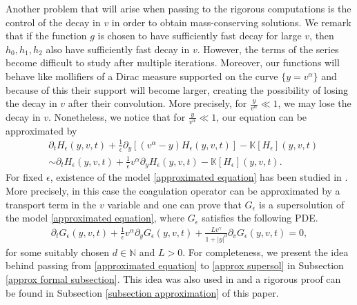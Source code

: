 \documentclass[11pt]{article}
\numberwithin{equation}{section}
\begin{document}
Another problem that will arise when passing to the rigorous computations is the control of the decay in $v$ in order to obtain mass-conserving solutions. We remark that if the function $g$ is chosen to have sufficiently fast decay for large $v$, then $h_{0}, h_{1}, h_{2}$ also have sufficiently fast decay in $v$. However, the terms of the series become difficult to study after multiple iterations. Moreover, our functions will behave like mollifiers of a Dirac measure supported on the curve $\{y=v^{\alpha}\}$ and because of this their support will become larger, creating the possibility of losing the decay in $v$ after their convolution. More precisely, for $\frac{y}{v^{\alpha}}\ll 1$, we may lose the decay in $v$. Nonetheless, we notice that for $\frac{y}{v^{\alpha}}\ll 1$, our equation can be approximated by
\begin{align}
&\partial_{t}H_{\epsilon}(y,v,t)+\frac{1}{\epsilon}\partial_{y}[(v^{\alpha}-y)H_{\epsilon}(y,v,t)]-\mathbb{K}[H_{\epsilon}](y,v,t)\label{approx eq part one}\\
&\sim \partial_{t}H_{\epsilon}(y,v,t)+\frac{1}{\epsilon}v^{\alpha}\partial_{y}H_{\epsilon}(y,v,t)-\mathbb{K}[H_{\epsilon}](y,v,t).\label{approximated equation}
\end{align}
For fixed $\epsilon$, existence of the model \eqref{approximated equation} has been studied in  \cite{cristianinhom}. More precisely, in this case the coagulation operator can be approximated by a transport term in the $v$ variable and one can prove that $G_{\epsilon}$ is a supersolution of the model \eqref{approximated equation}, where $G_{\epsilon}$ satisfies the following PDE.
\begin{align}\label{approx supersol}
    \partial_{t}G_{\epsilon}(y,v,t)+\frac{1}{\epsilon}v^{\alpha}\partial_{y}G_{\epsilon}(y,v,t)+\frac{L v^{\gamma} }{1+|y|^{d}}\partial_{v}G_{\epsilon}(y,v,t)=0,
\end{align}
for some suitably chosen $d\in\mathbb{N}$ and $L>0$. For completeness, we present the idea behind passing from \eqref{approximated equation} to \eqref{approx supersol} in Subsection \ref{approx formal subsection}. This idea was also used in \cite[Section 2.1]{cristianinhom} and a rigorous proof can be found in Subsection \ref{subsection approximation} of this paper.
\end{document}
